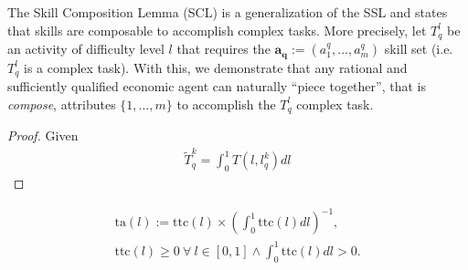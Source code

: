 \documentclass[hidelinks, nonatbib]{elsarticle}
\begin{document}
\begin{lemma}
    \label{scl}
    The Skill Composition Lemma (SCL) is a generalization of the SSL and states that skills are composable to accomplish complex tasks. More precisely, let $T_{q}^{l}$ be an activity of difficulty level $l$ that requires the $\boldsymbol{a_q} := (a_{1}^{q}, \dots, a_{m}^{q})$ skill set (i.e. $T_{q}^{l}$ is a complex task). With this, we demonstrate that any rational and sufficiently qualified economic agent can naturally ``piece together'', that is \textit{compose}, attributes $\{1, \dots, m\}$ to accomplish the $T_{q}^{l}$ complex task.
    
    \begin{proof}
        Given 
        \begin{gather}
            \tilde{T}_{q}^{k} = 
            \int_{0}^{1}{
                T(l, l_{q}^{k})
                dl
            }
        \end{gather}
    \end{proof}
\end{lemma}
\begin{definition}
    \label{ta}
    \begin{gather}
        \text{ta}(l)
        :=
        \text{ttc}(l)
        \times
        \left(
            \int_{0}^{1}
            \text{ttc}(l)
            dl
        \right) ^ {-1}
        ,
        \\
        \text{ttc}(l)
        \geq
        0
        \
        \forall
        \
        l \in [0,1]
        \land
        \int_{0}^{1}
            \text{ttc}(l)
            dl
            >
            0
        .
    \end{gather}
    
\end{definition} 
\end{document}
